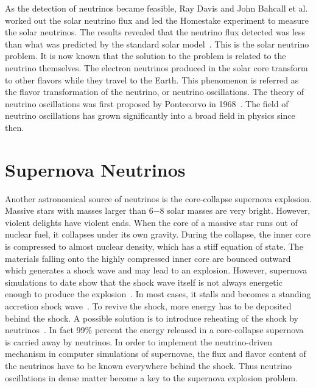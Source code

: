 As the detection of neutrinos became feasible, Ray Davis and John Bahcall et al. worked out the solar neutrino flux and led the Homestake experiment to measure the solar neutrinos. The results revealed that the neutrino flux detected was less than what was predicted by the standard solar model~\cite{Bahcall1973}. This is the solar neutrino problem. It is now known that the solution to the problem is related to the neutrino themselves. The electron neutrinos produced in the solar core transform to other flavors while they travel to the Earth. This phenomenon is referred as the flavor transformation of the neutrino, or neutrino oscillations. The theory of neutrino oscillations was first proposed by Pontecorvo in 1968~\cite{Pontecorvo1968}. The field of neutrino oscillations has grown significantly into a broad field in physics since then.



\section{Supernova Neutrinos}


Another astronomical source of neutrinos is the core-collapse supernova explosion. Massive stars with masses larger than 6−8 solar masses are very bright. However, violent delights have violent ends. When the core of a massive star runs out of nuclear fuel, it collapses under its own gravity. During the collapse, the inner core is compressed to almost nuclear density, which has a stiff equation of state. The materials falling onto the highly compressed inner core are bounced outward which generates a shock wave and may lead to an explosion. However, supernova simulations to date show that the shock wave itself is not always energetic enough to produce the explosion~\cite{Janka2016b}. In most cases, it stalls and becomes a standing accretion shock wave~\cite{Bethe1985r}. To revive the shock, more energy has to be deposited behind the shock. A possible solution is to introduce reheating of the shock by neutrinos~\cite{Janka2016b}. In fact 99\% percent the energy released in a core-collapse supernova is carried away by neutrinos.
In order to implement the neutrino-driven mechanism in computer simulations of supernovae, the flux and flavor content of the neutrinos have to be known everywhere behind the shock. Thus neutrino oscillations in dense matter become a key to the supernova explosion problem.

